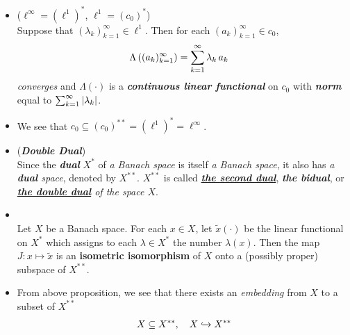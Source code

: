 \documentclass[11pt]{article}
\begin{document}
\begin{itemize}
\item \begin{example} ($\ell^{\infty} = (\ell^1)^{*}$, $\ell^1 = (c_0)^{*}$)\\
Suppose that $(\lambda_k)_{k= 1}^{\infty} \in \ell^1$. Then for each $(a_k)_{k=1}^{\infty} \in c_0$,
\begin{align*}
\Lambda\left((a_k)_{k=1}^{\infty}\right) &= \sum_{k=1}^{\infty}\lambda_k\, a_k
\end{align*} \emph{converges} and $\Lambda(\cdot)$ is a \emph{\textbf{continuous linear functional}} on $c_0$ with \emph{\textbf{norm}} equal
to $\sum_{k=1}^{\infty}\left\lvert \lambda_k \right\rvert$. 
\end{example}

\item \begin{remark}
We see that $c_0 \subseteq  (c_0)^{**} = (\ell^1)^{*} = \ell^{\infty}$.
\end{remark}

\item \begin{definition} (\emph{\textbf{Double Dual}})\\
Since the \emph{\textbf{dual}} $X^{*}$ of \emph{a Banach space} is itself \textit{a Banach space}, it also has \emph{a \textbf{dual} space}, denoted by $X^{**}$. $X^{**}$ is called \underline{\emph{\textbf{the second dual}}}, \emph{\textbf{the bidual}}, or \emph{\textbf{\underline{the double dual}} of the space $X$}.
\end{definition}

\item \begin{proposition} \citep{reed1980methods}\\
Let $X$ be a Banach space. For each $x \in X$, let $\widetilde{x}(\cdot)$ be the linear functional on $X^{*}$ which assigns to each $\lambda \in X^{*}$ the number $\lambda(x)$. Then the map $J: x \mapsto \widetilde{x}$ is an \textbf{isometric isomorphism} of $X$ onto a (possibly proper) subspace of $X^{**}$.
\end{proposition}

\item \begin{remark}
From above proposition, we see that there exists an \emph{embedding} from $X$ to a subset of $X^{**}$
\begin{align*}
X \subseteq X^{**}, \quad X \xhookrightarrow{} X^{**}
\end{align*}
\end{remark}


\end{itemize}
\end{document}
